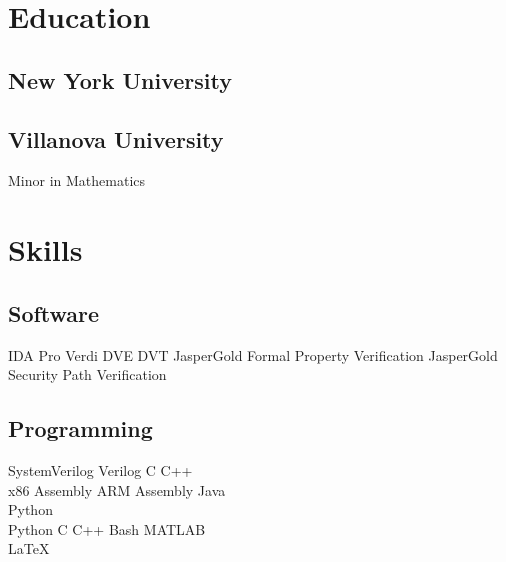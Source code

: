 \documentclass[]{detrano_resume}
\begin{document}
%
%


%
%

\begin{minipage}[t]{0.3\textwidth} 
	
	
	\section{Education} 
	
	\subsection{New York University}
	\sectionsep
	
	\subsection{Villanova University}
	Minor in Mathematics \\
	\sectionsep
	
	
	\section{Skills}
	\subsection{Software}
	IDA Pro \textbullet{}
	Verdi \textbullet{}
	DVE \textbullet{} 
	DVT\textbullet{} 
	JasperGold Formal Property Verification 
	\textbullet{} JasperGold Security Path Verification
	\sectionsep
	
	\subsection{Programming}
	SystemVerilog \textbullet{}
	Verilog \textbullet{}
	C \textbullet{} 
	C++ \\ %
	x86 Assembly \textbullet{} 
	ARM Assembly \textbullet{}
	Java \\ %
	Python
	\\ 
	\vspace{5pt}
	Python \textbullet{}
	C \textbullet{}
	C++ \textbullet{}
	Bash \textbullet{}
	MATLAB 
	\\
	\LaTeX\
	\sectionsep
\end{minipage} 
\end{document}
